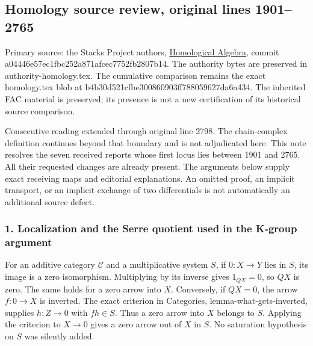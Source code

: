 \subsection{Homology source review, original lines 1901--2765}\label{homology-source-review-original-lines-19012765}

Primary source: the Stacks Project authors, \href{https://github.com/stacks/stacks-project/blob/a04446e57ec1fbc252a871afcec7752fb2807b14/homology.tex}{Homological Algebra}, commit a04446e57ec1fbc252a871afcec7752fb2807b14. The authority bytes are preserved in authority-homology.tex. The cumulative comparison remains the exact homology.tex blob at b4b30d521cfbe300860903ff788059627da6a434. The inherited FAC material is preserved; its presence is not a new certification of its historical source comparison.

Consecutive reading extended through original line 2798. The chain-complex definition continues beyond that boundary and is not adjudicated here. This note resolves the seven received reports whose first locus lies between 1901 and 2765. All their requested changes are already present. The arguments below supply exact receiving maps and editorial explanations. An omitted proof, an implicit transport, or an implicit exchange of two differentials is not automatically an additional source defect.

\subsubsection{1. Localization and the Serre quotient used in the K-group argument}\label{localization-and-the-serre-quotient-used-in-the-k-group-argument}

For an additive category \(\mathcal C\) and a multiplicative system \(S\), if \(0:X\to Y\) lies in \(S\), its image is a zero isomorphism. Multiplying by its inverse gives \(1_{QX}=0\), so \(QX\) is zero. The same holds for a zero arrow into \(X\). Conversely, if \(QX=0\), the arrow \(f:0\to X\) is inverted. The exact criterion in Categories, lemma-what-gets-inverted, supplies \(h:Z\to0\) with \(fh\in S\). Thus a zero arrow into \(X\) belongs to \(S\). Applying the criterion to \(X\to0\) gives a zero arrow out of \(X\) in \(S\). No saturation hypothesis on \(S\) was silently added.

